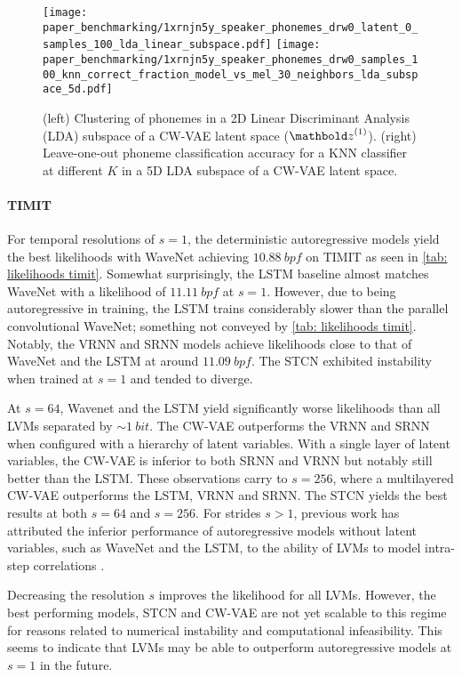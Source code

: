 %
\begin{figure*}[t]
    \centering
    \texttt{[image: paper\_benchmarking/1xrnjn5y\_speaker\_phonemes\_drw0\_latent\_0\_samples\_100\_lda\_linear\_subspace.pdf]}
    \hfill
    \texttt{[image: paper\_benchmarking/1xrnjn5y\_speaker\_phonemes\_drw0\_samples\_100\_knn\_correct\_fraction\_model\_vs\_mel\_30\_neighbors\_lda\_subspace\_5d.pdf]}
    \caption{
    (left) Clustering of phonemes in a 2D Linear Discriminant Analysis (LDA) subspace of a CW-VAE latent space ($\zb^{(1)}$).
    (right) Leave-one-out phoneme classification accuracy for a KNN classifier at different $K$ in a 5D LDA subspace of a CW-VAE latent space.
    }
    \label{fig: latent space phoneme and knn}
\end{figure*}
%

\paragraph{TIMIT}
For temporal resolutions of $s=1$, the deterministic autoregressive models yield the best likelihoods with WaveNet achieving $\SI{10.88}{bpf}$ on TIMIT as seen in \cref{tab: likelihoods timit}. 
Somewhat surprisingly, the LSTM baseline almost matches WaveNet with a likelihood of $\SI{11.11}{bpf}$ at $s=1$. However, due to being autoregressive in training, the LSTM trains considerably slower than the parallel convolutional WaveNet; something not conveyed by \cref{tab: likelihoods timit}. 
Notably, the VRNN and SRNN models achieve likelihoods close to that of WaveNet and the LSTM at around $\SI{11.09}{bpf}$. The STCN exhibited instability when trained at $s=1$ and tended to diverge.

At $s=64$, Wavenet and the LSTM yield significantly worse likelihoods than all LVMs separated by $\sim\SI{1}{bit}$.
The CW-VAE outperforms the VRNN and SRNN when configured with a hierarchy of latent variables. 
With a single layer of latent variables, the CW-VAE is inferior to both SRNN and VRNN but notably still better than the LSTM. 
These observations carry to $s=256$, where a multilayered CW-VAE outperforms the LSTM, VRNN and SRNN. 
The STCN yields the best results at both $s=64$ and $s=256$. 
For strides $s>1$, previous work has attributed the inferior performance of autoregressive models without latent variables, such as WaveNet and the LSTM, to the ability of LVMs to model intra-step correlations \cite{lai_re-examination_2019}. 

Decreasing the resolution $s$ improves the likelihood for all LVMs. However, the best performing models, STCN and CW-VAE are not yet scalable to this regime for reasons related to numerical instability and computational infeasibility. This seems to indicate that LVMs may be able to outperform autoregressive models at $s=1$ in the future.
